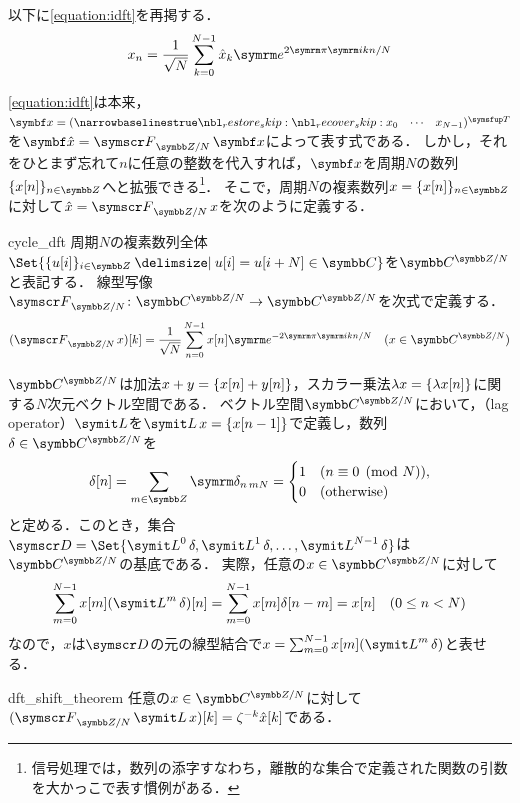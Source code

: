 \documentclass[../../main]{subfiles}
\begin{document}
以下に\cref{equation:idft}を再掲する．
\[
  x_n = \frac{1}{\sqrt{N}}\sum_{k=0}^{N-1}\hat{x}_k\napr^{2\krez\iuni kn/N}
\]

\cref{equation:idft}は本来，\(\vect{x}=\trps{\rowvect{x_0 & \cdots & x_{N-1}}}\)を\(\vect{\hat{x}}=\dft{N}\vect{x}\)によって表す式である．
しかし，それをひとまず忘れて\(n\)に任意の整数を代入すれば，\(\vect{x}\)を周期\(N\)の数列\(\seq{x[n]}_{n\in\numset{Z}}\)へと拡張できる\footnote{信号処理では，数列の添字\texttwoemdash すなわち，離散的な集合で定義された関数の引数\texttwoemdash を大かっこで表す慣例がある．}．
そこで，周期\(N\)の複素数列\(x=\seq{x[n]}_{n\in\numset{Z}}\)に対して\(\hat{x}=\dft{N}x\)を次のように定義する．

\begin{definition}{}{cycle_dft}
  周期\(N\)の複素数列全体\(\Set{\seq{u[i]}_{i\in\numset{Z}}\given u[i]=u[i+N]\in\numset{C}}\)を\(\cycles{\numset{C}}{N}\)と表記する．
  線型写像\(\dft{N}\colon\cycles{\numset{C}}{N}\to\cycles{\numset{C}}{N}\)を次式で定義する．
  \[
    (\dft{N}x)[k] =  \frac{1}{\sqrt{N}}\sum_{n=0}^{N-1}x[n]\napr^{-2\krez\iuni kn/N}\quad(x\in\cycles{\numset{C}}{N})
  \]
\end{definition}

\(\cycles{\numset{C}}{N}\)は加法\(x+y=\lbrace x[n]+y[n]\rbrace\)，スカラー乗法\(\lambda x=\lbrace\lambda x[n]\rbrace\)に関する\(N\)次元ベクトル空間である．
ベクトル空間\(\cycles{\numset{C}}{N}\)において，（lag operator）\(\lagop\)を\(\lagop x=\seq{x[n-1]}\)で定義し，数列\(\delta\in\cycles{\numset{C}}{N}\)を
\[
  \delta[n] = \sum_{m\in\numset{Z}}\kdelta{n}{mN}
  = \begin{cases}1 & (n\equiv 0\pmod{N}),\\ 0 & \text{(otherwise)}\end{cases}
\]
と定める．このとき，集合\(\basis{D}=\Set{\lagop^0\delta,\lagop^1\delta,\dots,\lagop^{N-1}\delta}\)は\(\cycles{\numset{C}}{N}\)の基底である．
実際，任意の\(x\in\cycles{\numset{C}}{N}\)に対して
\[
  \sum_{m=0}^{N-1}x[m](\lagop^m\delta)[n] = \sum_{m=0}^{N-1}x[m]\delta[n-m]
  = x[n]\quad(0\leq n<N)
\]
なので，\(x\)は\(\basis{D}\)の元の線型結合で\(x=\sum_{m=0}^{N-1}x[m](\lagop^m\delta)\)と表せる．

\begin{proposition}{}{dft_shift_theorem}
  任意の\(x\in\cycles{\numset{C}}{N}\)に対して\((\dft{N}\lagop x)[k]=\zeta^{-k}\hat{x}[k]\)である．
\end{proposition}
\end{document}

